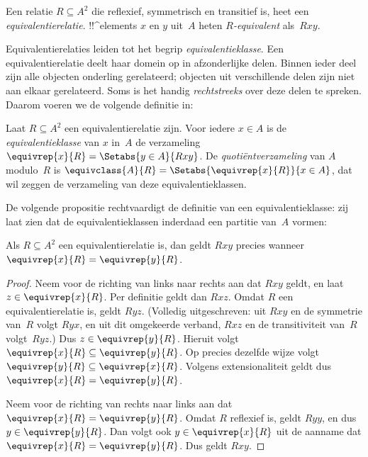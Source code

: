 \documentclass[openany]{memoir}
\begin{document}
\begin{defn}[Equivalentierelatie] 
Een relatie $R \subseteq A^2$ die reflexief, symmetrisch en
transitief is, heet een \emph{equivalentierelatie}. !!^{element}s $x$
en $y$ uit~$A$ heten \emph{$R$-equivalent} als~$Rxy$.
\end{defn}

Equivalentierelaties leiden tot het begrip \emph{equivalentieklasse}.
Een equivalentierelatie deelt haar domein op in afzonderlijke delen.
Binnen ieder deel zijn alle objecten onderling gerelateerd; objecten
uit verschillende delen zijn niet aan elkaar gerelateerd. Soms is het
handig \emph{rechtstreeks} over deze delen te spreken. Daarom voeren
we de volgende definitie in:

\begin{defn}
Laat $R \subseteq A^2$ een equivalentierelatie zijn. Voor iedere $x \in A$
is de \emph{equivalentieklasse} van $x$ in~$A$ de verzameling $\equivrep{x}{R}
= \Setabs{y \in A}{Rxy}$. De \emph{quotiëntverzameling} van $A$ modulo~$R$ is
$\equivclass{A}{R} = \Setabs{\equivrep{x}{R}}{x \in A}$, dat wil zeggen de
verzameling van deze equivalentieklassen. 
\end{defn}

De volgende propositie rechtvaardigt de definitie van een
equivalentieklasse: zij laat zien dat de equivalentieklassen inderdaad
een partitie van~$A$ vormen:

\begin{prop}
Als $R \subseteq A^2$ een equivalentierelatie is, dan geldt $Rxy$ precies wanneer
$\equivrep{x}{R} = \equivrep{y}{R}$.
\end{prop}

\begin{proof}
Neem voor de richting van links naar rechts aan dat $Rxy$ geldt, en laat $z \in
\equivrep{x}{R}$. Per definitie geldt dan $Rxz$. Omdat $R$ een
equivalentierelatie is, geldt $Ryz$. (Volledig uitgeschreven: uit $Rxy$
en de symmetrie van~$R$ volgt $Ryx$, en uit dit omgekeerde verband,
$Rxz$ en de transitiviteit van~$R$ volgt~$Ryz$.) Dus $z \in
\equivrep{y}{R}$.
Hieruit volgt $\equivrep{x}{R} \subseteq \equivrep{y}{R}$. Op precies
dezelfde wijze volgt $\equivrep{y}{R} \subseteq \equivrep{x}{R}$.
Volgens extensionaliteit geldt dus $\equivrep{x}{R} =
\equivrep{y}{R}$.

Neem voor de richting van rechts naar links aan dat $\equivrep{x}{R} =
\equivrep{y}{R}$. Omdat $R$ reflexief is, geldt $Ryy$, en dus $y \in
\equivrep{y}{R}$. Dan volgt ook $y \in \equivrep{x}{R}$ uit de aanname
dat $\equivrep{x}{R} = \equivrep{y}{R}$. Dus geldt $Rxy$.
\end{proof}
\end{document}
